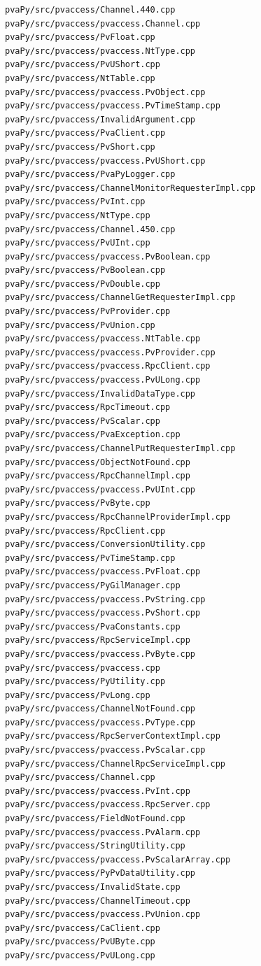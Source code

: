 \documentclass[11pt
  , a4paper
  , article
  , oneside
]{memoir}
\begin{document}
\begin{lstlisting}[style=termstylenumber, caption={Code List}, label={list:nfsroot-file}]
pvaPy/src/pvaccess/Channel.440.cpp
pvaPy/src/pvaccess/pvaccess.Channel.cpp
pvaPy/src/pvaccess/PvFloat.cpp
pvaPy/src/pvaccess/pvaccess.NtType.cpp
pvaPy/src/pvaccess/PvUShort.cpp
pvaPy/src/pvaccess/NtTable.cpp
pvaPy/src/pvaccess/pvaccess.PvObject.cpp
pvaPy/src/pvaccess/pvaccess.PvTimeStamp.cpp
pvaPy/src/pvaccess/InvalidArgument.cpp
pvaPy/src/pvaccess/PvaClient.cpp
pvaPy/src/pvaccess/PvShort.cpp
pvaPy/src/pvaccess/pvaccess.PvUShort.cpp
pvaPy/src/pvaccess/PvaPyLogger.cpp
pvaPy/src/pvaccess/ChannelMonitorRequesterImpl.cpp
pvaPy/src/pvaccess/PvInt.cpp
pvaPy/src/pvaccess/NtType.cpp
pvaPy/src/pvaccess/Channel.450.cpp
pvaPy/src/pvaccess/PvUInt.cpp
pvaPy/src/pvaccess/pvaccess.PvBoolean.cpp
pvaPy/src/pvaccess/PvBoolean.cpp
pvaPy/src/pvaccess/PvDouble.cpp
pvaPy/src/pvaccess/ChannelGetRequesterImpl.cpp
pvaPy/src/pvaccess/PvProvider.cpp
pvaPy/src/pvaccess/PvUnion.cpp
pvaPy/src/pvaccess/pvaccess.NtTable.cpp
pvaPy/src/pvaccess/pvaccess.PvProvider.cpp
pvaPy/src/pvaccess/pvaccess.RpcClient.cpp
pvaPy/src/pvaccess/pvaccess.PvULong.cpp
pvaPy/src/pvaccess/InvalidDataType.cpp
pvaPy/src/pvaccess/RpcTimeout.cpp
pvaPy/src/pvaccess/PvScalar.cpp
pvaPy/src/pvaccess/PvaException.cpp
pvaPy/src/pvaccess/ChannelPutRequesterImpl.cpp
pvaPy/src/pvaccess/ObjectNotFound.cpp
pvaPy/src/pvaccess/RpcChannelImpl.cpp
pvaPy/src/pvaccess/pvaccess.PvUInt.cpp
pvaPy/src/pvaccess/PvByte.cpp
pvaPy/src/pvaccess/RpcChannelProviderImpl.cpp
pvaPy/src/pvaccess/RpcClient.cpp
pvaPy/src/pvaccess/ConversionUtility.cpp
pvaPy/src/pvaccess/PvTimeStamp.cpp
pvaPy/src/pvaccess/pvaccess.PvFloat.cpp
pvaPy/src/pvaccess/PyGilManager.cpp
pvaPy/src/pvaccess/pvaccess.PvString.cpp
pvaPy/src/pvaccess/pvaccess.PvShort.cpp
pvaPy/src/pvaccess/PvaConstants.cpp
pvaPy/src/pvaccess/RpcServiceImpl.cpp
pvaPy/src/pvaccess/pvaccess.PvByte.cpp
pvaPy/src/pvaccess/pvaccess.cpp
pvaPy/src/pvaccess/PyUtility.cpp
pvaPy/src/pvaccess/PvLong.cpp
pvaPy/src/pvaccess/ChannelNotFound.cpp
pvaPy/src/pvaccess/pvaccess.PvType.cpp
pvaPy/src/pvaccess/RpcServerContextImpl.cpp
pvaPy/src/pvaccess/pvaccess.PvScalar.cpp
pvaPy/src/pvaccess/ChannelRpcServiceImpl.cpp
pvaPy/src/pvaccess/Channel.cpp
pvaPy/src/pvaccess/pvaccess.PvInt.cpp
pvaPy/src/pvaccess/pvaccess.RpcServer.cpp
pvaPy/src/pvaccess/FieldNotFound.cpp
pvaPy/src/pvaccess/pvaccess.PvAlarm.cpp
pvaPy/src/pvaccess/StringUtility.cpp
pvaPy/src/pvaccess/pvaccess.PvScalarArray.cpp
pvaPy/src/pvaccess/PyPvDataUtility.cpp
pvaPy/src/pvaccess/InvalidState.cpp
pvaPy/src/pvaccess/ChannelTimeout.cpp
pvaPy/src/pvaccess/pvaccess.PvUnion.cpp
pvaPy/src/pvaccess/CaClient.cpp
pvaPy/src/pvaccess/PvUByte.cpp
pvaPy/src/pvaccess/PvULong.cpp

\end{lstlisting}
\end{document}
